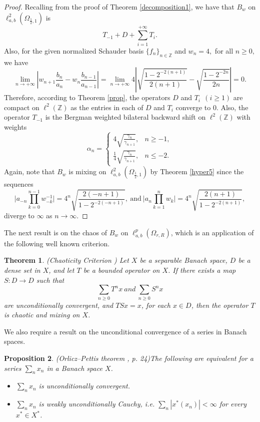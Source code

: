 \documentclass[12pt, reqno]{amsart}
\newtheorem{theorem}{Theorem}[section]
\newtheorem{proposition}[theorem]{Proposition}
\theoremstyle{definition}
\theoremstyle{remark}
\numberwithin{equation}{section}
\begin{document}
\begin{proof}
    Recalling from the proof of Theorem \ref{decomposition1}, we have that $B_{w}$ on $\ell^{2}_{a,b}(\Omega_{\frac{1}{2},1})$ is 
    \[
       T_{-1}+D+\sum_{i=1}^{+\infty}T_i.
     \]
     Also, for the given normalized Schauder basis $\{f_n\}_{n\in \mathbb{Z}}$ and $w_{n}=4,$ for all $n\geq 0,$ we have
     \[
     \lim_{ n \rightarrow +\infty} \left\lvert w_{n+1}\frac{b_{n}}{a_{n}}-w_{n}\frac{b_{n-1}}{a_{n-1}}\right\rvert=\lim_{ n \rightarrow +\infty} 4\left\lvert \sqrt{\frac{1-2^{-2(n+1)}}{2(n+1)}} -\sqrt{\frac{1-2^{-2n}}{2n}}\right\rvert=0.
     \]
    Therefore, according to Theorem \ref{prop}, the operators $D$ and $T_i~~(i\geq 1)$ are compact on $\ell^2(\mathbb{Z})$ as the entries in each of $D$ and $T_i$ converge to $0$. Also, the operator $T_{-1}$ is the Bergman weighted bilateral backward shift on $\ell^2(\mathbb{Z})$ with weights 
      \[
\alpha_{n} =
\begin{cases}
4\sqrt{\frac{\gamma_{n}}{\gamma_{n+1}}}, & n\ge -1,\\
\frac{1}{4}\sqrt{\frac{\gamma_{n}}{\gamma_{n+1}}}, & n\le-2.
\end{cases}
\]
Again, note that $B_{w}$ is mixing on $\ell^{2}_{a,b}(\Omega_{\frac{1}{2},1})$ by Theorem \ref{hyper5} since the sequences
\[
\Big| a_{-n}\prod_{k=0}^{n-1} w_{-k}^{-1} \Big|
= 
4^{n}\sqrt{\frac{2(-n+1)}{1-2^{-2(-n+1)}}},~\text{and}~
\Big| a_{n}\prod_{k=1}^{n} w_{k} \Big|
= 
4^{n}\sqrt{\frac{2(n+1)}{1-2^{-2(n+1)}}},
\]
diverge to $\infty$ as $n\rightarrow \infty$.

\end{proof}

The next result is on the chaos of $B_w$ on $\ell^p_{a,b}(\Omega_{r,R})$, which is an application of the following well known criterion.

\begin{theorem}\emph{\textsf{(Chaoticity Criterion \cite{Bonilla-Erdmann1})}} \label{chaos}
Let $X$ be a separable Banach space, $D$ be a dense set in $X$, and let $T$ be a bounded operator on $X$. If there exists a map $S:D\rightarrow D$ such that 
\[
\sum_{n\geq 0} T^nx~ and~ \sum_{n\geq 0} S^nx
\]
are unconditionally convergent, and $TSx=x$,
for each $x\in D$, then the operator $T$ is chaotic and mixing on $X$. 
\end{theorem}

We also require a result on the unconditional convergence of a series in Banach spaces.
\begin{proposition}\emph{\textsf{(Orlicz–Pettis theorem \cite{Diestel}, p. 24)}}\label{weakly cauchy}
The following are equivalent for a series $\sum_{n}x_{n}$ in a Banach space $X$.
\begin{itemize}
    \item[\textnormal{(i)}] $\sum_{n}x_{n}$ is unconditionally convergent. 
   \item[\textnormal{(ii)}] $\sum_n x_n$ is weakly unconditionally Cauchy, i.e. $\sum_n |x^*(x_n)|<\infty$ for every $x^*\in X^*$.
\end{itemize}
\end{proposition}
\end{document}
